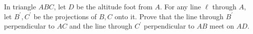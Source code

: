 In triangle $ABC$, let $D$ be the altitude foot from $A$. For any line $\ell$ through $A$, let $B^{\prime},C^{\prime}$ be the projections of $B,C$ onto it. Prove that the line through $B^{\prime}$ perpendicular to $AC$ and the line through $C^{\prime}$ perpendicular to $AB$ meet on $AD$.
